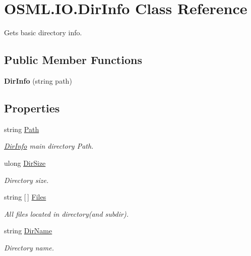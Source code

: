 \hypertarget{classOSML_1_1IO_1_1DirInfo}{}\section{O\+S\+M\+L.\+I\+O.\+Dir\+Info Class Reference}
\label{classOSML_1_1IO_1_1DirInfo}


Gets basic directory info.  


\subsection*{Public Member Functions}
\begin{DoxyCompactItemize}
\item 
\mbox{\label{classOSML_1_1IO_1_1DirInfo_ac5bf6a3002dc6540a333c3f26ae5f39a}} 
{\bfseries Dir\+Info} (string path)
\end{DoxyCompactItemize}
\subsection*{Properties}
\begin{DoxyCompactItemize}
\item 
string \mbox{\hyperlink{classOSML_1_1IO_1_1DirInfo_a7b4f3e10256a610fb0d149c07f0ba1d1}{Path}}
\begin{DoxyCompactList}\small\item\em \mbox{\hyperlink{classOSML_1_1IO_1_1DirInfo}{Dir\+Info}} main directory Path. \end{DoxyCompactList}\item 
ulong \mbox{\hyperlink{classOSML_1_1IO_1_1DirInfo_a1744a43553817377a6844cb7176c977b}{Dir\+Size}}
\begin{DoxyCompactList}\small\item\em Directory size. \end{DoxyCompactList}\item 
string \mbox{[}$\,$\mbox{]} \mbox{\hyperlink{classOSML_1_1IO_1_1DirInfo_a760123dfdd506f68aa05264fc0094bf1}{Files}}
\begin{DoxyCompactList}\small\item\em All files located in directory(and subdir). \end{DoxyCompactList}\item 
string \mbox{\hyperlink{classOSML_1_1IO_1_1DirInfo_a04ed29a0ce68da889e0237f0cd854dc6}{Dir\+Name}}
\begin{DoxyCompactList}\small\item\em Directory name. \end{DoxyCompactList}\end{DoxyCompactItemize}


